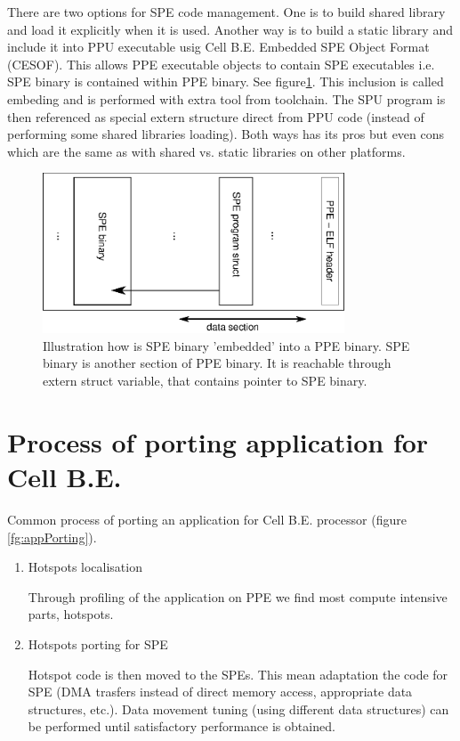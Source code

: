 \par
There are two options for SPE code management.
 One is to build shared library and load it explicitly when it is used.
Another way is to build a static library and include it into PPU executable usig Cell B.E. Embedded SPE Object Format (CESOF).
This allows PPE executable objects to contain SPE executables i.e. SPE binary is contained within PPE binary. See figure\ref{fg:SPEEmbedding}.
This inclusion is called embeding and is performed with extra tool from toolchain.
The SPU program is then referenced as special extern structure direct from PPU code (instead of performing some shared libraries loading).
Both ways has its pros but even cons which are the same as with shared vs. static libraries on other platforms.


\begin{figure}
    \centering
    \includegraphics[width=0.8\textwidth]{data/SPEEmbedding}
    \caption[SPE binary embedding]{Illustration how is SPE binary 'embedded' into a PPE binary.
SPE binary is another section of PPE binary.
It is reachable through extern struct variable, that contains pointer to SPE binary.}
    \label{fg:SPEEmbedding}
\end{figure}



\section {Process of porting application for Cell B.E.}

Common process of porting an application for Cell B.E. processor (figure \ref{fg:appPorting}).
\begin{enumerate}
\item Hotspots localisation
\par
Through profiling of the application on PPE we find most compute intensive parts, hotspots.

\item Hotspots porting for SPE
\par
Hotspot code is then moved to the SPEs.
This mean adaptation the code for SPE (DMA trasfers instead of direct memory access, appropriate data structures, etc.).
Data movement tuning (using different data structures) can be performed until satisfactory performance is obtained.
\end{enumerate}

